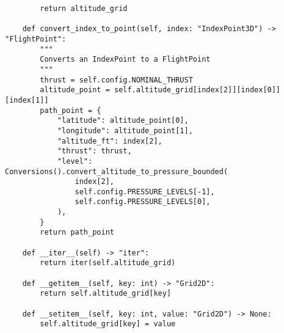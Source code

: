 \begin{verbatim}
        return altitude_grid

    def convert_index_to_point(self, index: "IndexPoint3D") -> "FlightPoint":
        """
        Converts an IndexPoint to a FlightPoint
        """
        thrust = self.config.NOMINAL_THRUST
        altitude_point = self.altitude_grid[index[2]][index[0]][index[1]]
        path_point = {
            "latitude": altitude_point[0],
            "longitude": altitude_point[1],
            "altitude_ft": index[2],
            "thrust": thrust,
            "level": Conversions().convert_altitude_to_pressure_bounded(
                index[2],
                self.config.PRESSURE_LEVELS[-1],
                self.config.PRESSURE_LEVELS[0],
            ),
        }
        return path_point

    def __iter__(self) -> "iter":
        return iter(self.altitude_grid)

    def __getitem__(self, key: int) -> "Grid2D":
        return self.altitude_grid[key]

    def __setitem__(self, key: int, value: "Grid2D") -> None:
        self.altitude_grid[key] = value

\end{verbatim}
